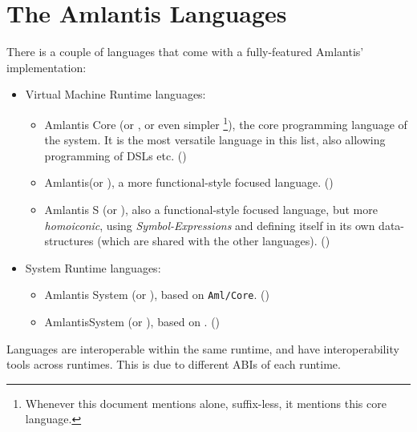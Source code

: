 \section*{The Amlantis Languages}
\label{sec:amlantis-languages}

There is a couple of languages that come with a fully-featured Amlantis' implementation:

\begin{itemize}
  \item Virtual Machine Runtime languages:
    \begin{itemize}
      \item Amlantis Core (or \AmlCore, or even simpler \Aml\footnote{Whenever this document mentions \Aml alone, suffix-less, it mentions this core language.}), the core programming language of the system. It is the most versatile language in this list, also allowing programming of DSLs etc. ()
      \item Amlantis\SharpSign (or \AmlSharp), a more functional-style focused language. ()
      \item Amlantis S (or \AmlS), also a functional-style focused language, but more {\em homoiconic}, using {\em Symbol-Expressions} and defining itself in its own data-structures (which are shared with the other  languages). ()
    \end{itemize}
  \item System Runtime languages:
    \begin{itemize}
      \item Amlantis System (or \AmlSystem), based on \mbox{\lstinline!Aml/Core!}. ()
      \item Amlantis\SharpSign System (or \AmlSharpSystem), based on \AmlSharp. ()
    \end{itemize}
\end{itemize}

Languages are interoperable within the same runtime, and have interoperability tools across runtimes. This is due to different ABIs of each runtime. 







